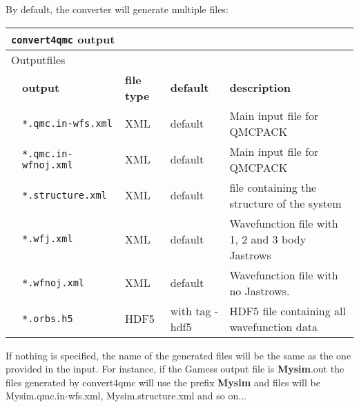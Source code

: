 By default, the converter will generate multiple files:\\
\begin{table}[h]
\begin{center}
\begin{tabularx}{\textwidth}{l l l l l }
\hline
\multicolumn{5}{l}{\texttt{convert4qmc} output} \\
\hline
\multicolumn{2}{l}{Outputfiles}  & \multicolumn{3}{l}{}\\
   &   \bfseries output     & \bfseries file type & \bfseries default   & \bfseries description \\
   &   \texttt{*.qmc.in-wfs.xml             } &  XML  & default& Main input file for QMCPACK\\
   &   \texttt{*.qmc.in-wfnoj.xml             } &  XML  & default& Main input file for QMCPACK\\
   &   \texttt{*.structure.xml             } &  XML   &default   & file containing the structure of the system\\
   &   \texttt{*.wfj.xml             } &  XML  & default & Wavefunction file with 1, 2 and 3 body Jastrows\\
   &   \texttt{*.wfnoj.xml             } &  XML   & default & Wavefunction file with no Jastrows. \\
   &   \texttt{*.orbs.h5             } &  HDF5   & with tag -hdf5   & HDF5 file containing all wavefunction data\\
    \hline
    \end{tabularx}
\end{center}
\end{table}

If nothing is specified, the name of the generated files will be the same as the one provided in the input. For instance, if the Gamess output file is \textbf{Mysim}.out the files generated by convert4qmc will use the prefix \textbf{Mysim} and files will be Mysim.qmc.in-wfs.xml, Mysim.structure.xml and so on...

